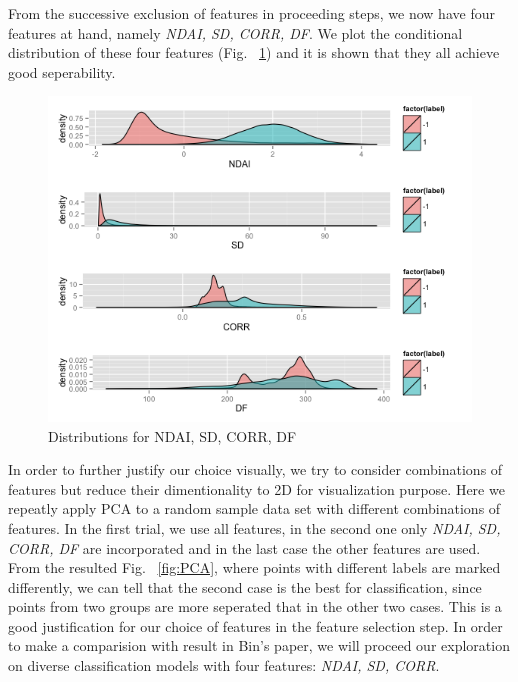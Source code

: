 \documentclass[english]{article}\usepackage{graphicx, color}
\numberwithin{equation}{section}
\numberwithin{figure}{section}
\begin{document}
From the successive exclusion of features in proceeding steps, we now have 
four features at hand, namely \textit{NDAI, SD, CORR, DF}. We plot the 
conditional distribution of these four features (Fig. ~\ref{fig:CD}) and it is 
shown that they all achieve good seperability.

\begin{figure}[!h]
  \begin{center}
    \includegraphics[width=\columnwidth]{figures/ConditionalDistribution.png}
  \end{center}
  \caption{Distributions for NDAI, SD, CORR, DF}
  \label{fig:CD}
\end{figure}

In order to further justify our choice visually, we try to consider combinations
of features but reduce their dimentionality to 2D for visualization purpose. 
Here we repeatly apply PCA to a random sample data set with different 
combinations of features. In the first trial, we use all features, in the second 
one only \textit{NDAI, SD, CORR, DF} are incorporated and in the last case 
the other features are used. From the resulted Fig. ~\ref{fig:PCA}, where 
points with different labels are marked differently, we can tell that the second 
case is the best for classification, since points from two groups are more 
seperated that in the other two cases. This is a good justification for our 
choice of features in the feature selection step. In order to make a comparision 
with result in Bin's paper,  we will proceed our exploration on diverse 
classification models with four features: \textit{NDAI, SD, CORR}.
\end{document}
